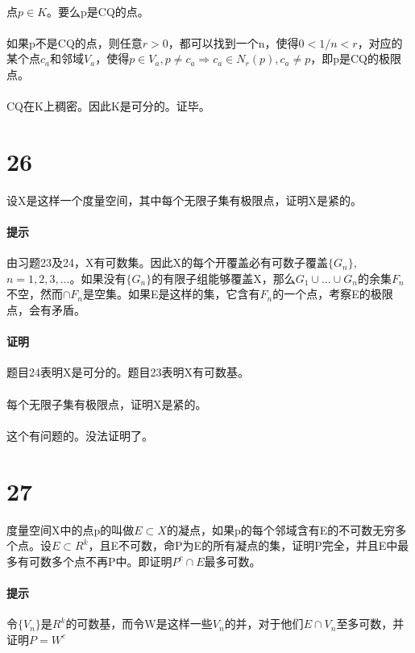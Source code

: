 \paragraph{} 点$p \in K$。要么p是CQ的点。
\paragraph{} 如果p不是CQ的点，则任意$r>0$，都可以找到一个n，使得$ 0 < 1/n < r$，对应的某个点$c_a$和邻域$ V_a$，使得$p \in V_a, p \ne c_a \Rightarrow c_a \in N_r(p), c_a \ne p$，即p是CQ的极限点。
\paragraph{} CQ在K上稠密。因此K是可分的。证毕。
\section*{26} 设X是这样一个度量空间，其中每个无限子集有极限点，证明X是紧的。
\paragraph{提示} 由习题23及24，X有可数集。因此X的每个开覆盖必有可数子覆盖$\{G_n\}$,\\$n=1, 2,3,...$。如果没有$\{G_n\}$的有限子组能够覆盖X，那么$G_1 \cup ... \cup G_n$的余集$F_n$不空，然而$\cap F_n$是空集。如果E是这样的集，它含有$F_n$的一个点，考察E的极限点，会有矛盾。
\paragraph{证明} 题目24表明X是可分的。题目23表明X有可数基。
\paragraph{} 每个无限子集有极限点，证明X是紧的。
\paragraph{} 这个有问题的。没法证明了。
\section*{27} 度量空间X中的点p的叫做$E \subset X$的凝点，如果p的每个邻域含有E的不可数无穷多个点。设$E \subset R^k$，且E不可数，命P为E的所有凝点的集，证明P完全，并且E中最多有可数多个点不再P中。即证明$P^c \cap E$最多可数。
\paragraph*{提示}令$\{V_n\}$是$R^k$的可数基，而令W是这样一些$V_n$的并，对于他们$E\cap V_n$至多可数，并证明$P=W^c$
